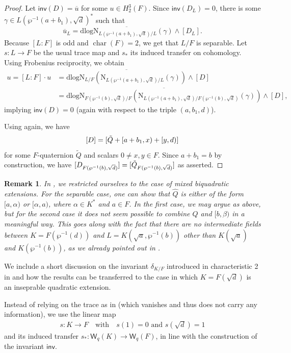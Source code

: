 \documentclass{amsart}
\newtheorem{remark}[definition]{Remark}
\numberwithin{equation}{section}
\DeclareMathOperator{\cha}{char }
\newcommand{\quat}[1]{[#1)}
\newcommand{\norm}{\mathrm{N}}
\newcommand{\dlog}{\mathrm{dlog}}
\newcommand{\W}{\mathsf{W}}
\newcommand{\inv}{\mathsf{inv}}
\begin{document}
\begin{proof}
    Let $\inv(D) = \overline u$ for some $u \in H_2^3(F)$.
    Since $\inv(D_L) = 0$, there is some $\gamma \in L(\wp^{-1}(a + b_1), \sqrt d)^\ast$ such that 
    \[\overline u_L = \overline{\dlog\norm_{L(\wp^{-1}(a + b_1), \sqrt d) / L}(\gamma)} \wedge [D_L].\]
    Because $[L:F]$ is odd and $\cha(F) = 2$, we get that $L/F$ is separable.
    Let $s: L \to F$ be the usual trace map and $s_\ast$ its induced transfer on cohomology.
    Using Frobenius reciprocity, we obtain
    \begin{align*}
        u = [L:F]\cdot u &= \overline{\dlog \norm_{L / F}(\norm_{L(\wp^{-1}(a + b_1), \sqrt d) / L}(\gamma))} \wedge [D]\\
        &= \overline{\dlog \norm_{F(\wp^{-1}(b), \sqrt{d}) / F}(\norm_{L(\wp^{-1}(a + b_1), \sqrt d) / F(\wp^{-1}(b), \sqrt{d})}(\gamma))} \wedge [D],
    \end{align*}
    implying $\inv(D) = 0$ (again with respect to the triple $(a, b_1, d)$).
    
    Using  again, we have 
    \[[D] = [\Tilde{Q} + \quat{a + b_1, x} + \quat{y, d}]\]
    for some $F$-quaternion $\tilde Q$ and scalars $0\neq x, y \in F$.
    Since $a + b_1 = b$ by construction, we have
    $[D_{F(\wp^{-1}(b), \sqrt d)}] = [\Tilde{Q}_{F(\wp^{-1}(b), \sqrt d)}]$ as asserted.
\end{proof}

\begin{remark}
	In , we restricted ourselves to the case of mixed biquadratic extensions. 
	For the separable case, one can show that $\widehat Q$ is either of the form $\quat{a, \alpha}$ or $\quat{\alpha, a}$, where $\alpha \in K^\ast$ and $a \in F$.
	In the first case, we may argue as above, but for the second case it does not seem possible to combine $\widehat Q$ and $\quat{b, \beta}$ in a meaningful way.
	This goes along with the fact that there are no intermediate fields between $K = F(\wp^{-1}(d))$ and $L = K(\sqrt a, \wp^{-1}(b))$ other than $K(\sqrt a)$ and $K(\wp^{-1}(b))$, as we already pointed out in .
\end{remark}


We include a short discussion on the invariant $\delta_{K/F}$ introduced in characteristic 2 in \cite{BarryChapmanLaghribi_DescentBiquaternion} and how the results can be transferred to the case in which $K = F(\sqrt d)$ is an inseprable quadratic extension.

Instead of relying on the trace as in \cite{BarryChapmanLaghribi_DescentBiquaternion} (which vanishes and thus does not carry any information), we use the linear map 
\begin{align} \label{eq_LinearMapInsep}
	s: K \to F\quad \text{with} \quad s(1) = 0 \text{ and }s(\sqrt d) = 1
\end{align} 
and its induced transfer $s_\ast: \W_q(K) \to \W_q(F)$, in line with the construction of the invariant $\inv$.
\end{document}
